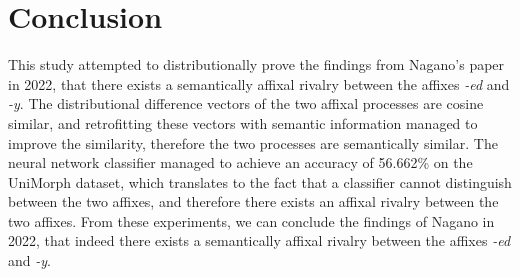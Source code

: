 \documentclass[12pt]{article}
\begin{document}
\section{Conclusion}    
    This study attempted to distributionally prove the findings from Nagano's paper in 2022, that there exists a semantically affixal rivalry between the affixes \emph{-ed} and \emph{-y}. The distributional difference vectors of the two affixal processes are cosine similar, and retrofitting these vectors with semantic information managed to improve the similarity, therefore the two processes are semantically similar. The neural network classifier managed to achieve an accuracy of 56.662\% on the UniMorph dataset, which translates to the fact that a classifier cannot distinguish between the two affixes, and therefore there exists an affixal rivalry between the two affixes. From these experiments, we can conclude the findings of Nagano in 2022, that indeed there exists a semantically affixal rivalry between the affixes \emph{-ed} and \emph{-y}. 
\nocite{*}

\end{document}
